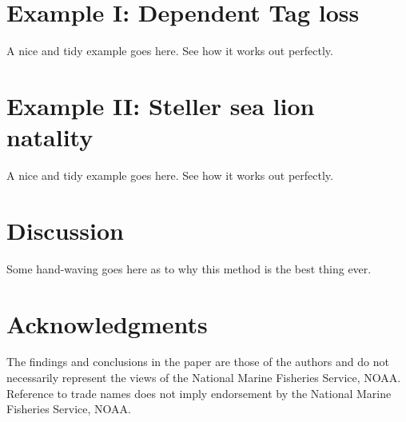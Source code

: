 \documentclass[fleqn]{article}
\begin{document}
\section{Example I: Dependent Tag loss}

A nice and tidy example goes here. See how it works out perfectly.

\section{Example II: Steller sea lion natality}

A nice and tidy example goes here. See how it works out perfectly.

\section{Discussion}

Some hand-waving goes here as to why this method is the best thing ever.


\section*{Acknowledgments}
The findings and conclusions in the paper are those of the authors and do not necessarily represent the views of the National Marine Fisheries Service, NOAA. Reference to trade names does not imply endorsement by the National Marine Fisheries Service, NOAA.

\renewcommand{\baselinestretch}{1}\normalsize



\clearpage


\renewcommand{\arraystretch}{1.33}
\end{document}
